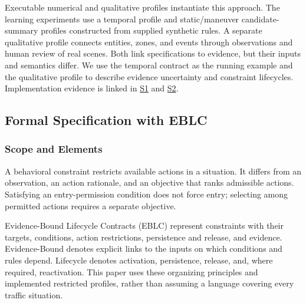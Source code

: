 \documentclass[nolineno]{ieeeaccess}
\begin{document}
Executable numerical and qualitative profiles instantiate this approach. The learning experiments use a temporal profile and static/maneuver candidate-summary profiles constructed from supplied synthetic rules. A separate qualitative profile connects entities, zones, and events through observations and human review of real scenes. Both link specifications to evidence, but their inputs and semantics differ. We use the temporal contract as the running example and the qualitative profile to describe evidence uncertainty and constraint lifecycles. Implementation evidence is linked in \href{\detokenize{/home/jinhyun/prj_ws/prj_jin/guardsynth-cc/projects/04-guardsynth-coc/experiments/paper1_cnl_learning/temporal_preservation.py}}{S1} and \href{\detokenize{/home/jinhyun/prj_ws/prj_jin/guardsynth-cc/platforms/eblc-bcv/src/guard_synth_eblc/action_contract.py}}{S2}.\par

\subsection{Formal Specification with EBLC}

\subsubsection{Scope and Elements}

A behavioral constraint restricts available actions in a situation. It differs from an observation, an action rationale, and an objective that ranks admissible actions. Satisfying an entry-permission condition does not force entry; selecting among permitted actions requires a separate objective.\par

Evidence-Bound Lifecycle Contracts (EBLC) represent constraints with their targets, conditions, action restrictions, persistence and release, and evidence. Evidence-Bound denotes explicit links to the inputs on which conditions and rules depend. Lifecycle denotes activation, persistence, release, and, where required, reactivation. This paper uses these organizing principles and implemented restricted profiles, rather than assuming a language covering every traffic situation.\par
\end{document}
